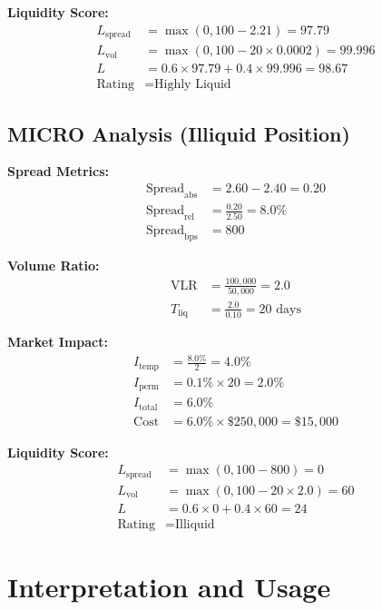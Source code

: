 \documentclass[11pt,a4paper]{article}
\begin{document}
\textbf{Liquidity Score:}
\begin{align*}
L_{\text{spread}} &= \max(0, 100 - 2.21) = 97.79 \\
L_{\text{vol}} &= \max(0, 100 - 20 \times 0.0002) = 99.996 \\
L &= 0.6 \times 97.79 + 0.4 \times 99.996 = 98.67 \\
\text{Rating} &= \text{Highly Liquid}
\end{align*}

\subsection{MICRO Analysis (Illiquid Position)}

\textbf{Spread Metrics:}
\begin{align*}
\text{Spread}_{\text{abs}} &= 2.60 - 2.40 = 0.20 \\
\text{Spread}_{\text{rel}} &= \frac{0.20}{2.50} = 8.0\% \\
\text{Spread}_{\text{bps}} &= 800
\end{align*}

\textbf{Volume Ratio:}
\begin{align*}
\text{VLR} &= \frac{100,000}{50,000} = 2.0 \\
T_{\text{liq}} &= \frac{2.0}{0.10} = 20 \text{ days}
\end{align*}

\textbf{Market Impact:}
\begin{align*}
I_{\text{temp}} &= \frac{8.0\%}{2} = 4.0\% \\
I_{\text{perm}} &= 0.1\% \times 20 = 2.0\% \\
I_{\text{total}} &= 6.0\% \\
\text{Cost} &= 6.0\% \times \$250,000 = \$15,000
\end{align*}

\textbf{Liquidity Score:}
\begin{align*}
L_{\text{spread}} &= \max(0, 100 - 800) = 0 \\
L_{\text{vol}} &= \max(0, 100 - 20 \times 2.0) = 60 \\
L &= 0.6 \times 0 + 0.4 \times 60 = 24 \\
\text{Rating} &= \text{Illiquid}
\end{align*}

\section{Interpretation and Usage}
\end{document}
